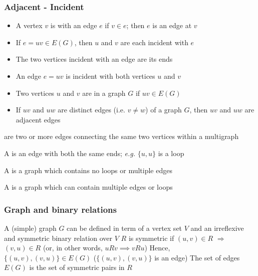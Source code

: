 \documentclass[aspectratio=43]{beamer}
\begin{document}
\begin{frame}\frametitle{Adjacent - Incident}
	\begin{definition}[Incident]
	\begin{itemize}
	\item A vertex $v$ is  with an edge $e$ if $v\in e$; then $e$ is an edge at $v$
	\item If $e=uv\in E(G)$, then $u$ and $v$ are each incident with $e$
	\item The two vertices incident with an edge are its ends
	\item An edge $e=uv$ is incident with both vertices $u$ and $v$
	\end{itemize}
	\end{definition}
	\vfill
	\begin{definition}[Adjacent]
	\begin{itemize}
	\item Two vertices $u$ and $v$ are  in a graph $G$ if $uv\in E(G)$
	\item If $uv$ and $uw$ are distinct edges (i.e. $v\not=w$) of a graph $G$, then $uv$ and $uw$ are adjacent edges
	\end{itemize}
	\end{definition}
\end{frame}


\begin{frame}
	\begin{definition}
	 are two or more edges connecting the same two vertices within a multigraph
	\end{definition}
	\vfill
	\begin{definition}[Loop]
	A  is an edge with both the same ends; \emph{e.g.} $\{u,u\}$ is a loop
	\end{definition}
	\vfill
	\begin{definition}
		A  is a graph which contains no loops or multiple edges
	\end{definition}
	\vfill
	\begin{definition}[Multigraph]
		A  is a graph which can contain multiple edges or loops
	\end{definition}
\end{frame}


\begin{frame}\frametitle{Graph and binary relations}
	A (simple) graph $G$ can be defined in term of a vertex set $V$ and an irreflexive and symmetric binary relation over $V$
	\vfill
	$R$ is symmetric if $(u,v)\in R$ $\Rightarrow$ $(v,u)\in R$  (or, in other words, $uRv\implies vRu$)
	\vfill
	Hence, $\{(u,v),(v,u)\}\in E(G)$ ($\{(u,v),(v,u)\}$ is an edge)
	\vfill
	The set of edges $E(G)$ is the set of symmetric pairs in $R$
\end{frame}
\end{document}
